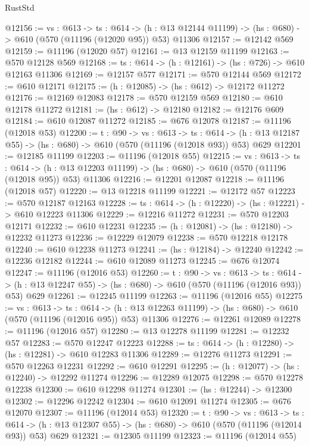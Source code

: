 \begin{lexlean}{RustStd}
\begin{coremodule}
@12156 := {vs : @613} ->
  {ts : @614} ->
  (h : @13 @12144 @11199) -> (hs : @680) -> @610 (@570 (@11196 (@12020 @95)) @53) @11306
@12157 := @12142 @569
@12159 := @11196 (@12020 @57)
@12161 := @13 @12159 @11199
@12163 := @570 @12128 @569
@12168 := {ts : @614} -> (h : @12161) -> (hs : @726) -> @610 @12163 @11306
@12169 := @12157 @577
@12171 := @570 @12144 @569
@12172 := @610 @12171
@12175 := (h : @12085) -> (hs : @612) -> @12172 @11272
@12176 := @12169 @12083
@12178 := @570 @12159 @569
@12180 := @610 @12178 @11272
@12181 := (hs : @612) -> @12180
@12182 := @12176 @609
@12184 := @610 @12087 @11272
@12185 := @676 @12078
@12187 := @11196 (@12018 @53)
@12200 := {t : @90} ->
  {vs : @613} ->
  {ts : @614} -> (h : @13 @12187 @55) -> (hs : @680) -> @610 (@570 (@11196 (@12018 @93)) @53) @629
@12201 := @12185 @11199
@12203 := @11196 (@12018 @55)
@12215 := {vs : @613} ->
  {ts : @614} ->
  (h : @13 @12203 @11199) -> (hs : @680) -> @610 (@570 (@11196 (@12018 @95)) @53) @11306
@12216 := @12201 @12087
@12218 := @11196 (@12018 @57)
@12220 := @13 @12218 @11199
@12221 := @12172 @57
@12223 := @570 @12187 @12163
@12228 := {ts : @614} -> (h : @12220) -> (hs : @12221) -> @610 @12223 @11306
@12229 := @12216 @11272
@12231 := @570 @12203 @12171
@12232 := @610 @12231
@12235 := (h : @12081) -> (hs : @12180) -> @12232 @11273
@12236 := @12229 @12079
@12238 := @570 @12218 @12178
@12240 := @610 @12238 @11273
@12241 := (hs : @12184) -> @12240
@12242 := @12236 @12182
@12244 := @610 @12089 @11273
@12245 := @676 @12074
@12247 := @11196 (@12016 @53)
@12260 := {t : @90} ->
  {vs : @613} ->
  {ts : @614} -> (h : @13 @12247 @55) -> (hs : @680) -> @610 (@570 (@11196 (@12016 @93)) @53) @629
@12261 := @12245 @11199
@12263 := @11196 (@12016 @55)
@12275 := {vs : @613} ->
  {ts : @614} ->
  (h : @13 @12263 @11199) -> (hs : @680) -> @610 (@570 (@11196 (@12016 @95)) @53) @11306
@12276 := @12261 @12089
@12278 := @11196 (@12016 @57)
@12280 := @13 @12278 @11199
@12281 := @12232 @57
@12283 := @570 @12247 @12223
@12288 := {ts : @614} -> (h : @12280) -> (hs : @12281) -> @610 @12283 @11306
@12289 := @12276 @11273
@12291 := @570 @12263 @12231
@12292 := @610 @12291
@12295 := (h : @12077) -> (hs : @12240) -> @12292 @11274
@12296 := @12289 @12075
@12298 := @570 @12278 @12238
@12300 := @610 @12298 @11274
@12301 := (hs : @12244) -> @12300
@12302 := @12296 @12242
@12304 := @610 @12091 @11274
@12305 := @676 @12070
@12307 := @11196 (@12014 @53)
@12320 := {t : @90} ->
  {vs : @613} ->
  {ts : @614} -> (h : @13 @12307 @55) -> (hs : @680) -> @610 (@570 (@11196 (@12014 @93)) @53) @629
@12321 := @12305 @11199
@12323 := @11196 (@12014 @55)

\end{coremodule}
\end{lexlean}
